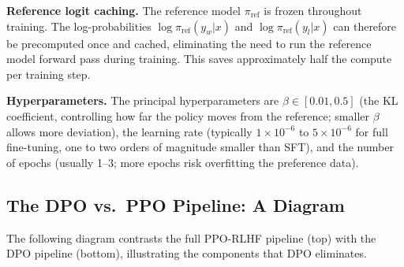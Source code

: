 \textbf{Reference logit caching.} The reference model $\pi_\mathrm{ref}$ is frozen throughout training. The log-probabilities $\log\pi_\mathrm{ref}(y_w|x)$ and $\log\pi_\mathrm{ref}(y_l|x)$ can therefore be precomputed once and cached, eliminating the need to run the reference model forward pass during training. This saves approximately half the compute per training step.

\textbf{Hyperparameters.} The principal hyperparameters are $\beta \in [0.01, 0.5]$ (the KL coefficient, controlling how far the policy moves from the reference; smaller $\beta$ allows more deviation), the learning rate (typically $1\times10^{-6}$ to $5\times10^{-6}$ for full fine-tuning, one to two orders of magnitude smaller than SFT), and the number of epochs (usually 1--3; more epochs risk overfitting the preference data).

\subsection{The DPO vs.\ PPO Pipeline: A Diagram}

The following diagram contrasts the full PPO-RLHF pipeline (top) with the DPO pipeline (bottom), illustrating the components that DPO eliminates.

